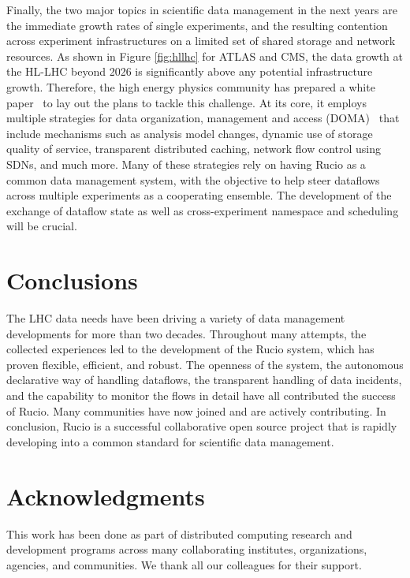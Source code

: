 \documentclass[11pt]{article}
\begin{document}
Finally, the two major topics in scientific data management in the next years are the immediate growth rates of single experiments, and the resulting contention across experiment infrastructures on a limited set of shared storage and network resources. As shown in Figure \ref{fig:hllhc} for ATLAS and CMS, the data growth at the HL-LHC beyond 2026 is significantly above any potential infrastructure growth. Therefore, the high energy physics community has prepared a white paper~\cite{roadmap} to lay out the plans to tackle this challenge. At its core, it employs multiple strategies for data organization, management and access (DOMA)~\cite{doma} that include mechanisms such as analysis model changes, dynamic use of storage quality of service, transparent distributed caching, network flow control using SDNs, and much more. Many of these strategies rely on having Rucio as a common data management system, with the objective to help steer dataflows across multiple experiments as a cooperating ensemble. The development of the exchange of dataflow state as well as cross-experiment namespace and scheduling will be crucial.

\section{Conclusions}
\label{sec:conc}

The LHC data needs have been driving a variety of data management developments for more than two decades. Throughout many attempts, the collected experiences led to the development of the Rucio system, which has proven flexible, efficient, and robust. The openness of the system, the autonomous declarative way of handling dataflows, the transparent handling of data incidents, and the capability to monitor the flows in detail have all contributed the success of Rucio. Many communities have now joined and are actively contributing. In conclusion, Rucio is a successful collaborative open source project that is rapidly developing into a common standard for scientific data management.

\section*{Acknowledgments}

This work has been done as part of distributed computing research and development programs across many collaborating institutes, organizations, agencies, and communities.  We thank all our colleagues for their support.
\end{document}
